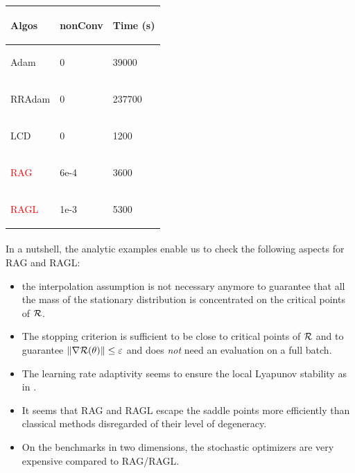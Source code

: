 \begin{table}[h!]
	\begin{tabular}{lll}
		\toprule
		\begin{bf} Algos \end{bf} & \begin{bf}nonConv\end{bf} & \begin{bf}Time (s)\end{bf} \\ \midrule
		\begin{bf}Adam\end{bf} & 0 & 39000 \\ \midrule
		\begin{bf}RRAdam\end{bf} & 0 & 237700 \\ \midrule
		\begin{bf}LCD\end{bf} & 0 & 1200 \\ \midrule
		\begin{bf}\textcolor{red}{RAG}\end{bf} & 6e-4 & 3600 \\ \midrule
		\begin{bf}\textcolor{red}{RAGL}\end{bf} & 1e-3 & 5300 \\ \bottomrule
	\end{tabular}
	\label{poly_exec_sto}
\end{table}

\paragraph{}
In a nutshell, the analytic examples enable us to check the following aspects for RAG and RAGL:
\begin{itemize}
	\item the interpolation assumption is not necessary anymore to guarantee that all the mass of the stationary distribution is concentrated on the critical points of $\mathcal{R}$.
        \item The stopping criterion is sufficient to be close to critical points of $\mathcal{R}$ and to guarantee $\|\nabla \mathcal{R}(\theta)\|\leq \varepsilon$ and does {\em not} need an evaluation on a full batch.
	\item The learning rate adaptivity seems to ensure the local Lyapunov stability as in \cite{Bilel,Bilel_thesis}.
	\item It seems that RAG and RAGL escape the saddle points more efficiently than classical methods disregarded of their level of degeneracy.
	\item On the benchmarks in two dimensions, the stochastic optimizers are very expensive compared to RAG/RAGL. 
\end{itemize}

